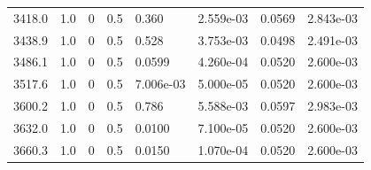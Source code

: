 \documentclass[preview]{standalone}
\begin{document}
{{{\begin{tabular}{L{1.2cm}C{1.2cm} C{0.3cm}C{0.5cm} C{1.4cm}C{1.4cm} C{1.4cm}C{1.4cm}}
  3418.0  &   1.0  & 0     & 0.5 &  0.360  & 2.559e-03  & 0.0569 &  2.843e-03   \\ 
  3438.9  &   1.0  & 0     & 0.5 &  0.528  & 3.753e-03  & 0.0498 &  2.491e-03   \\ 
  3486.1  &   1.0  & 0     & 0.5 &  0.0599  & 4.260e-04  & 0.0520 &  2.600e-03   \\ 
  3517.6  &   1.0  & 0     & 0.5 &  7.006e-03  & 5.000e-05  & 0.0520 &  2.600e-03   \\ 
  3600.2  &   1.0  & 0     & 0.5 &  0.786  & 5.588e-03  & 0.0597 &  2.983e-03   \\ 
  3632.0  &   1.0  & 0     & 0.5 &  0.0100  & 7.100e-05  & 0.0520 &  2.600e-03   \\ 
  3660.3  &   1.0  & 0     & 0.5 &  0.0150  & 1.070e-04  & 0.0520 &  2.600e-03   \\ 
\hline 
\end{tabular} 

}}}
\end{document}
